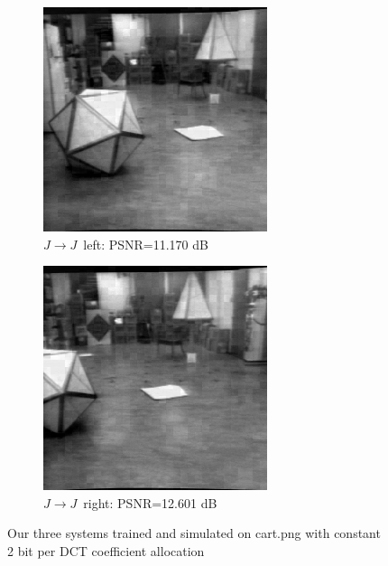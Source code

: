 \documentclass[10pt,twoside,titlepage]{article}
\newcommand{\sysJJ}{\mbox{$J \rightarrow J$}}
\begin{document}
\begin{figure}
    \centering
    \begin{subfigure}{0.5\textwidth}
        \centering
        \includegraphics[width=0.6\linewidth]{img/cart_jj_left.png}
        \caption{\sysJJ\ left: PSNR=11.170 dB}
    \end{subfigure}%
    \begin{subfigure}{0.5\textwidth}
        \centering
        \includegraphics[width=0.6\linewidth]{img/cart_jj_right.png}
        \caption{\sysJJ\ right: PSNR=12.601 dB}
    \end{subfigure}
    \caption{Our three systems trained and simulated on cart.png with constant 2 bit per DCT coefficient allocation}
    \label{fig:cart_jj}
    \label{fig:cart_results}
\end{figure}
\end{document}
